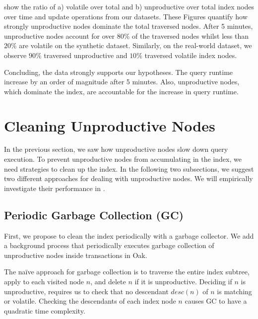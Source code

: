 \documentclass[abstracton,12pt]{scrartcl}
\theoremstyle{definition}
\begin{document}
show the ratio of a) volatile over total and b) unproductive over total index nodes
over time and update operations from our datasets. These Figures quantify how
strongly unproductive nodes dominate the total traversed nodes. After 5 minutes,
unproductive nodes account for over $80\%$ of the traversed nodes whilst
less than $20\%$ are volatile on the synthetic dataset.
Similarly, on the real-world dataset, we observe $90\%$ traversed unproductive and $10\%$
traversed volatile index nodes.

Concluding, the data strongly supports our hypotheses. The query runtime
increase by an order of magnitude after 5 minutes. Also, unproductive
nodes, which dominate the index, are accountable for the increase in query runtime. 

\newpage

\section{Cleaning Unproductive Nodes}

In the previous section, we saw how unproductive nodes slow down query
execution. To prevent unproductive nodes from accumulating in the index, we
need strategies to clean up the index. In the following two subsections, we suggest two
different approaches for dealing with unproductive nodes. We will empirically
investigate their performance in .

\subsection{Periodic Garbage Collection (GC)}
\label{sec:gc}

First, we propose to clean the index periodically with a garbage collector.
We add a background process that periodically executes
garbage collection of unproductive nodes inside transactions in Oak.

The naïve approach for garbage collection is to traverse the entire index subtree,
apply  to each visited node $n$, and delete $n$ if it
is unproductive. Deciding if $n$ is unproductive, requires us to check that no
descendant $desc(n)$ of $n$ is matching or volatile. Checking the descendants of
each index node $n$ causes GC to have a quadratic time complexity.
\end{document}
